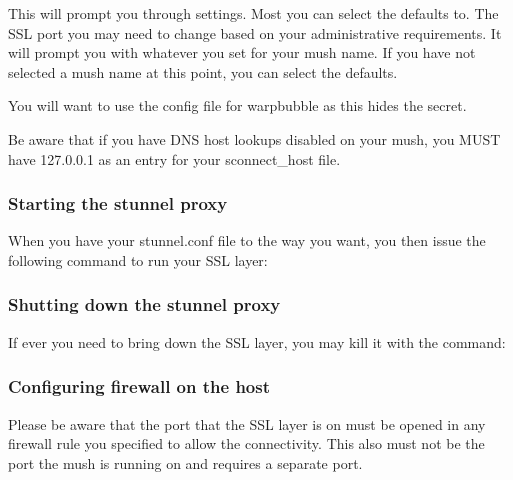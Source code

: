 \documentclass[letterpaper,10pt,english]{sphinxmanual}
\begin{document}
\begin{sphinxVerbatim}[commandchars=\\\{\}]
\end{sphinxVerbatim}

\sphinxAtStartPar
This will prompt you through settings.  Most you can select the defaults to.
The SSL port you may need to change based on your administrative requirements.
It will prompt you with whatever you set for your mush name.  If you have not
selected a mush name at this point, you can select the defaults.

\sphinxAtStartPar
You will want to use the config file for warpbubble as this hides the secret.

\sphinxAtStartPar
Be aware that if you have DNS host lookups disabled on your mush, you
MUST have 127.0.0.1 as an entry for your sconnect\_host file.


\subsubsection{Starting the stunnel proxy}
\label{\detokenize{security:starting-the-stunnel-proxy}}
\sphinxAtStartPar
When you have your stunnel.conf file to the way you want, you then
issue the following command to run your SSL layer:

\begin{sphinxVerbatim}[commandchars=\\\{\}]
\end{sphinxVerbatim}


\subsubsection{Shutting down the stunnel proxy}
\label{\detokenize{security:shutting-down-the-stunnel-proxy}}
\sphinxAtStartPar
If ever you need to bring down the SSL layer, you may kill it with the command:

\begin{sphinxVerbatim}[commandchars=\\\{\}]
\end{sphinxVerbatim}


\subsubsection{Configuring firewall on the host}
\label{\detokenize{security:configuring-firewall-on-the-host}}
\sphinxAtStartPar
Please be aware that the port that the SSL layer is on must be opened
in any firewall rule you specified to allow the connectivity.  This also must
not be the port the mush is running on and requires a separate port.
\end{document}
